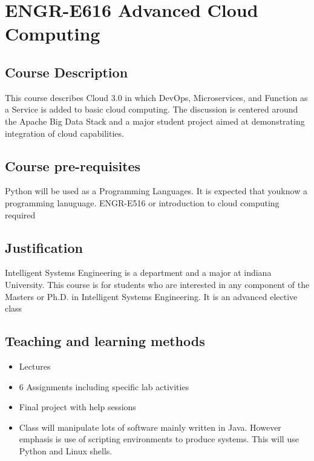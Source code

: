 \FILENAME
{}

\section{ENGR-E616 Advanced Cloud Computing}

\subsection{Course Description }

This course describes Cloud 3.0 in which DevOps, Microservices, and
Function as a Service is added to basic cloud computing. The
discussion is centered around the Apache Big Data Stack and a major
student project aimed at demonstrating integration of cloud
capabilities.

\subsection{Course pre-requisites}

Python will be used as a Programming Languages. It is expected that
youknow a programming lanuguage. ENGR-E516 or introduction to cloud
computing required

\subsection{Justification}

Intelligent Systems Engineering is a department and a major at indiana
University. This course is for students who are interested in any
component of the Masters or Ph.D. in Intelligent Systems Engineering.
It is an advanced elective class


\subsection{Teaching and learning methods}

\begin{itemize}
\item	Lectures
\item	6 Assignments including specific lab activities
\item	Final project with help sessions
\item	Class will manipulate lots of software mainly written in Java. However emphasis is use of scripting environments to produce systems. This will use Python and Linux shells.
\end{itemize}

